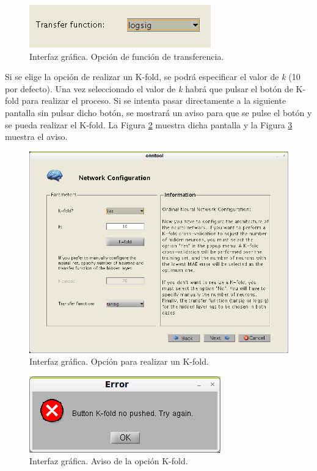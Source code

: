 		\begin{figure}[htbp]
			\centering
			\includegraphics[scale=1]{interfaz/interface11.png}
			\caption{Interfaz gráfica. Opción de función de transferencia.}
			\label{fig:int11}
		\end{figure}
		
		Si se elige la opción de realizar un K-fold, se podrá especificar el valor de \textit{k} (10 por defecto). Una vez seleccionado el valor de \textit{k} habrá que pulsar el botón de K-fold para realizar el proceso. Si se intenta pasar directamente a la siguiente pantalla sin pulsar dicho botón, se mostrará un aviso para que se pulse el botón y se pueda realizar el K-fold. La Figura \ref{fig:int12} muestra dicha pantalla y la Figura \ref{fig:int12-1} muestra el aviso.\\
		
		\begin{figure}[htbp]
			\centering
			\includegraphics[scale=0.5]{interfaz/interface12.png}
			\caption{Interfaz gráfica. Opción para realizar un K-fold.}
			\label{fig:int12}
		\end{figure}
		
		\begin{figure}[htbp]
			\centering
			\includegraphics[scale=1]{interfaz/interface12-1.png}
			\caption{Interfaz gráfica. Aviso de la opción K-fold.}
			\label{fig:int12-1}
		\end{figure}
		
